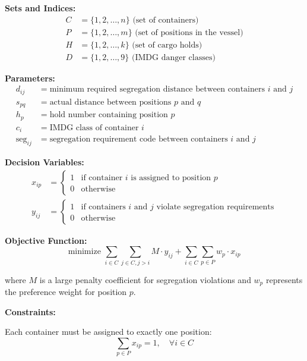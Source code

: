 \documentclass{article}
\begin{document}
\textbf{Sets and Indices:}
\begin{align}
C &= \{1, 2, \ldots, n\} \text{ (set of containers)} \\
P &= \{1, 2, \ldots, m\} \text{ (set of positions in the vessel)} \\
H &= \{1, 2, \ldots, k\} \text{ (set of cargo holds)} \\
D &= \{1, 2, \ldots, 9\} \text{ (IMDG danger classes)}
\end{align}

\textbf{Parameters:}
\begin{align}
d_{ij} &= \text{minimum required segregation distance between containers } i \text{ and } j \\
s_{pq} &= \text{actual distance between positions } p \text{ and } q \\
h_p &= \text{hold number containing position } p \\
c_i &= \text{IMDG class of container } i \\
\text{seg}_{ij} &= \text{segregation requirement code between containers } i \text{ and } j
\end{align}

\textbf{Decision Variables:}
\begin{align}
x_{ip} &= \begin{cases} 1 & \text{if container } i \text{ is assigned to position } p \\ 0 & \text{otherwise} \end{cases} \\
y_{ij} &= \begin{cases} 1 & \text{if containers } i \text{ and } j \text{ violate segregation requirements} \\ 0 & \text{otherwise} \end{cases}
\end{align}

\textbf{Objective Function:}
\begin{equation}
\text{minimize } \sum_{i \in C} \sum_{j \in C, j > i} M \cdot y_{ij} + \sum_{i \in C} \sum_{p \in P} w_p \cdot x_{ip}
\end{equation}

where $M$ is a large penalty coefficient for segregation violations and $w_p$ represents the preference weight for position $p$.

\textbf{Constraints:}

Each container must be assigned to exactly one position:
\begin{equation}
\sum_{p \in P} x_{ip} = 1, \quad \forall i \in C
\end{equation}
\end{document}
